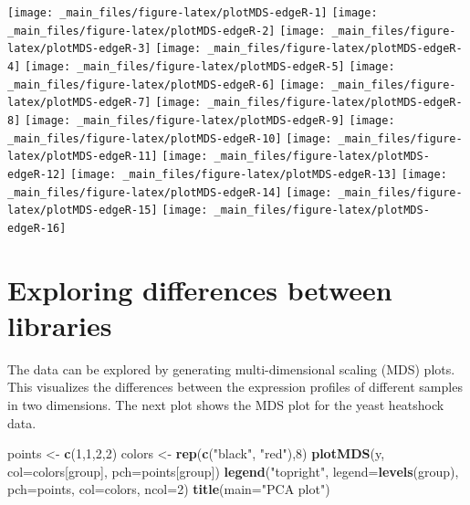 \documentclass[
]{book}
\newenvironment{Shaded}{\begin{snugshade}}{\end{snugshade}}
\newcommand{\AttributeTok}[1]{\textcolor[rgb]{0.13,0.29,0.53}{#1}}
\newcommand{\DecValTok}[1]{\textcolor[rgb]{0.00,0.00,0.81}{#1}}
\newcommand{\FunctionTok}[1]{\textcolor[rgb]{0.13,0.29,0.53}{\textbf{#1}}}
\newcommand{\NormalTok}[1]{#1}
\newcommand{\OtherTok}[1]{\textcolor[rgb]{0.56,0.35,0.01}{#1}}
\newcommand{\StringTok}[1]{\textcolor[rgb]{0.31,0.60,0.02}{#1}}
\begin{document}
\texttt{[image: \_main\_files/figure-latex/plotMDS-edgeR-1]} \texttt{[image: \_main\_files/figure-latex/plotMDS-edgeR-2]} \texttt{[image: \_main\_files/figure-latex/plotMDS-edgeR-3]} \texttt{[image: \_main\_files/figure-latex/plotMDS-edgeR-4]} \texttt{[image: \_main\_files/figure-latex/plotMDS-edgeR-5]} \texttt{[image: \_main\_files/figure-latex/plotMDS-edgeR-6]} \texttt{[image: \_main\_files/figure-latex/plotMDS-edgeR-7]} \texttt{[image: \_main\_files/figure-latex/plotMDS-edgeR-8]} \texttt{[image: \_main\_files/figure-latex/plotMDS-edgeR-9]} \texttt{[image: \_main\_files/figure-latex/plotMDS-edgeR-10]} \texttt{[image: \_main\_files/figure-latex/plotMDS-edgeR-11]} \texttt{[image: \_main\_files/figure-latex/plotMDS-edgeR-12]} \texttt{[image: \_main\_files/figure-latex/plotMDS-edgeR-13]} \texttt{[image: \_main\_files/figure-latex/plotMDS-edgeR-14]} \texttt{[image: \_main\_files/figure-latex/plotMDS-edgeR-15]} \texttt{[image: \_main\_files/figure-latex/plotMDS-edgeR-16]}

\hypertarget{exploring-differences-between-libraries}{%
\section{Exploring differences between libraries}\label{exploring-differences-between-libraries}}

The data can be explored by generating multi-dimensional scaling (MDS)
plots. This visualizes the differences between the expression profiles
of different samples in two dimensions. The next plot shows the MDS plot
for the yeast heatshock data.

\begin{Shaded}
\begin{Highlighting}[]
\NormalTok{points }\OtherTok{\textless{}{-}} \FunctionTok{c}\NormalTok{(}\DecValTok{1}\NormalTok{,}\DecValTok{1}\NormalTok{,}\DecValTok{2}\NormalTok{,}\DecValTok{2}\NormalTok{)}
\NormalTok{colors }\OtherTok{\textless{}{-}} \FunctionTok{rep}\NormalTok{(}\FunctionTok{c}\NormalTok{(}\StringTok{"black"}\NormalTok{, }\StringTok{"red"}\NormalTok{),}\DecValTok{8}\NormalTok{)}
\FunctionTok{plotMDS}\NormalTok{(y, }\AttributeTok{col=}\NormalTok{colors[group], }\AttributeTok{pch=}\NormalTok{points[group])}
\FunctionTok{legend}\NormalTok{(}\StringTok{"topright"}\NormalTok{, }\AttributeTok{legend=}\FunctionTok{levels}\NormalTok{(group),}
     \AttributeTok{pch=}\NormalTok{points, }\AttributeTok{col=}\NormalTok{colors, }\AttributeTok{ncol=}\DecValTok{2}\NormalTok{)}
\FunctionTok{title}\NormalTok{(}\AttributeTok{main=}\StringTok{"PCA plot"}\NormalTok{)}
\end{Highlighting}
\end{Shaded}
\end{document}
